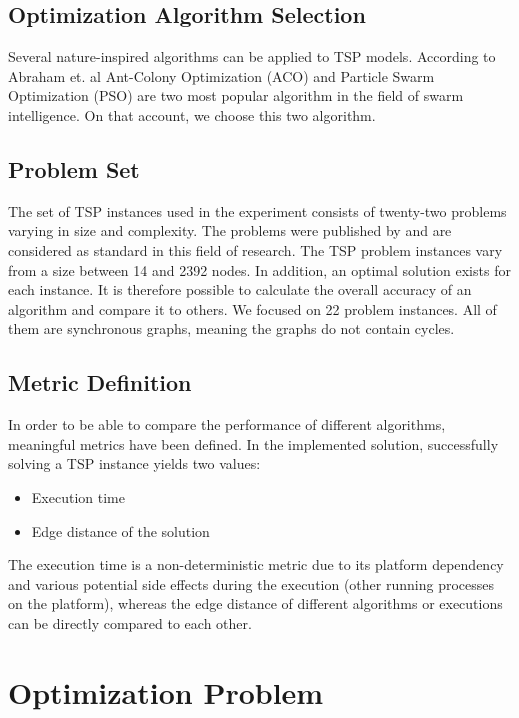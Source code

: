\documentclass[conference]{IEEEtran}
\begin{document}
	\subsection{Optimization Algorithm Selection}\label{algos}
	Several nature-inspired algorithms can be applied to TSP models. According to Abraham et. al \cite{abraham2007swarm} Ant-Colony Optimization (ACO) and Particle Swarm Optimization (PSO) are two most popular algorithm in the field of swarm intelligence. On that account, we choose this two algorithm. 

	\subsection{Problem Set}\label{problem_set}
	The set of TSP instances used in the experiment consists of twenty-two problems varying in size and complexity. The problems were published by \cite{tsplib2019} and are considered as standard in this field of research. The TSP problem instances vary from a size between 14 and 2392 nodes. In addition, an optimal solution exists for each instance. It is therefore possible to calculate the overall accuracy of an algorithm and compare it to others. We focused on 22 problem instances. All of them  are synchronous graphs, meaning the graphs do not contain cycles.
	
	\subsection{Metric Definition}\label{metric}
	In order to be able to compare the performance of different algorithms, meaningful metrics have been defined. In the implemented solution, successfully solving a TSP instance yields two values:
	\begin{itemize}
		\item Execution time
		\item Edge distance of the solution
	\end{itemize}
	The execution time is a non-deterministic metric due to its platform dependency and various potential side effects during the execution (other running processes on the platform), whereas the edge distance of different algorithms or executions can be directly compared to each other.
	
	\section{Optimization Problem}
\end{document}
